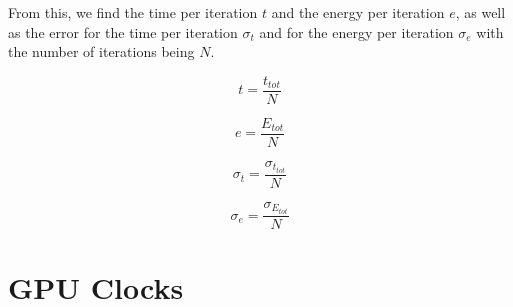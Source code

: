 From this, we find the time per iteration \( t \) and the energy per iteration \( e \), as well as the error for the time per iteration \( \sigma_t \) and for the energy per iteration \( \sigma_e \) with the number of iterations being \( N \).

\begin{equation}
t = \frac{t_{tot}}{N}
\end{equation}

\begin{equation}
e = \frac{E_{tot}}{N}
\end{equation}

\begin{equation}
\sigma_t = \frac{\sigma_{t_{tot}}}{N}
\end{equation}

\begin{equation}
\sigma_e = \frac{\sigma_{E_{tot}}}{N}
\end{equation}



\section{GPU Clocks}